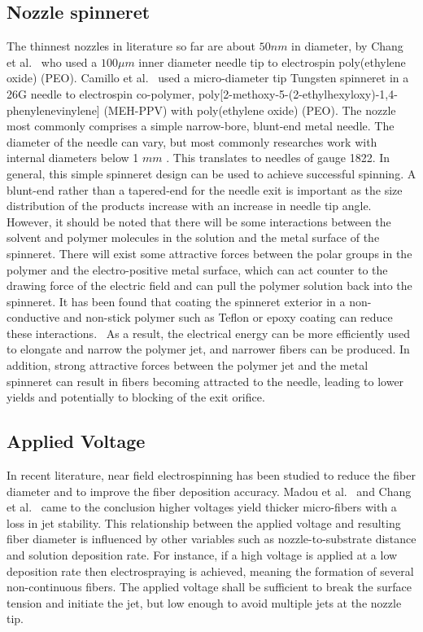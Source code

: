 \documentclass[5p,,preprint,12pt,twocolumn]{elsarticle}
\begin{document}
\subsection{Nozzle spinneret}The thinnest nozzles in literature so far are about $50 nm $ in diameter, by Chang et al.\unskip~\cite{527120:11974306} who used a  $100 \mu m $ inner diameter needle tip to electrospin poly(ethylene oxide) (PEO). Camillo et al.\unskip~\cite{527120:12322072} used a micro-diameter tip Tungsten spinneret in a 26G needle to electrospin co-polymer, poly[2-methoxy-5-(2-ethylhexyloxy)-1,4-phenylenevinylene] (MEH-PPV) with poly(ethylene oxide) (PEO). The nozzle most commonly comprises a simple narrow-bore, blunt-end metal needle. The diameter of the needle can vary, but most commonly researches work with internal diameters below 1 $mm $ . This translates to needles of gauge 18{\textendash}22. In general, this simple spinneret design can be used to achieve successful spinning. A blunt-end rather than a tapered-end for the needle exit is important as the size distribution of the products increase with an increase in needle tip angle. However, it should be noted that there will be some interactions between the solvent and polymer molecules in the solution and the metal surface of the spinneret. There will exist some attractive forces between the polar groups in the polymer and the electro-positive metal surface, which can act counter to the drawing force of the electric field and can pull the polymer solution back into the spinneret. It has been found that coating the spinneret exterior in a non-conductive and non-stick polymer such as Teflon or epoxy coating can reduce these interactions.\unskip~\cite{527120:13082768,527120:13082811} As a result, the electrical energy can be more efficiently used to elongate and narrow the polymer jet, and narrower fibers can be produced. In addition, strong attractive forces between the polymer jet and the metal spinneret can result in fibers becoming attracted to the needle, leading to lower yields and potentially to blocking of the exit orifice.



\subsection{Applied Voltage}In recent literature, near field electrospinning has been studied to reduce the fiber diameter and to improve the fiber deposition accuracy. Madou et al.\unskip~\cite{527120:11973130} and Chang et al.\unskip~\cite{527120:11974306} came to the conclusion higher voltages yield thicker micro-fibers with a loss in jet stability. This relationship between the applied voltage and resulting fiber diameter is influenced by other variables such as nozzle-to-substrate distance and solution deposition rate. For instance, if a high voltage is applied at a low deposition rate then electrospraying is achieved, meaning the formation of several non-continuous fibers. The applied voltage shall be sufficient to break the surface tension and initiate the jet, but low enough to avoid multiple jets at the nozzle tip.
\end{document}
